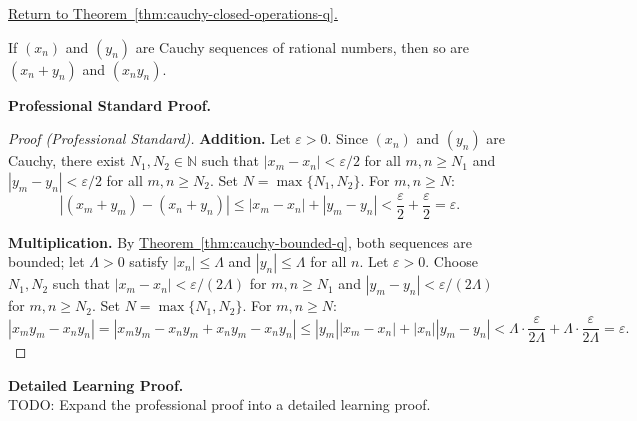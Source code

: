 
\newpage
{}
\label{prf:cauchy-closed-operations-q}

\begin{remark*}[Return]
\hyperref[thm:cauchy-closed-operations-q]{Return to Theorem~\ref*{thm:cauchy-closed-operations-q}.}
\end{remark*}

\begin{theorem*}
If $(x_n)$ and $(y_n)$ are Cauchy sequences of rational numbers, then so
are $(x_n + y_n)$ and $(x_n y_n)$.
\end{theorem*}

\textbf{Professional Standard Proof.}~\\
\begin{proof}
[Proof (Professional Standard)]
\textbf{Addition.}
Let $\varepsilon > 0$.  Since $(x_n)$ and $(y_n)$ are Cauchy, there exist
$N_1, N_2 \in \mathbb{N}$ such that
$|x_m - x_n| < \varepsilon/2$ for all $m,n \geq N_1$ and
$|y_m - y_n| < \varepsilon/2$ for all $m,n \geq N_2$.
Set $N = \max\{N_1, N_2\}$.  For $m, n \geq N$:
\[
|(x_m + y_m) - (x_n + y_n)|
\leq |x_m - x_n| + |y_m - y_n|
< \frac{\varepsilon}{2} + \frac{\varepsilon}{2} = \varepsilon.
\]

\textbf{Multiplication.}
By \hyperref[thm:cauchy-bounded-q]{Theorem~\ref*{thm:cauchy-bounded-q}},
both sequences are bounded; let $\Lambda > 0$ satisfy $|x_n| \leq \Lambda$
and $|y_n| \leq \Lambda$ for all $n$.
Let $\varepsilon > 0$.  Choose $N_1, N_2$ such that
$|x_m - x_n| < \varepsilon/(2\Lambda)$ for $m,n \geq N_1$ and
$|y_m - y_n| < \varepsilon/(2\Lambda)$ for $m,n \geq N_2$.
Set $N = \max\{N_1, N_2\}$.  For $m, n \geq N$:
\[
|x_m y_m - x_n y_n|
= |x_m y_m - x_n y_m + x_n y_m - x_n y_n|
\leq |y_m||x_m - x_n| + |x_n||y_m - y_n|
< \Lambda \cdot \frac{\varepsilon}{2\Lambda} + \Lambda \cdot \frac{\varepsilon}{2\Lambda}
= \varepsilon.
\]
\end{proof}

\textbf{Detailed Learning Proof.}~\\
TODO: Expand the professional proof into a detailed learning proof.


